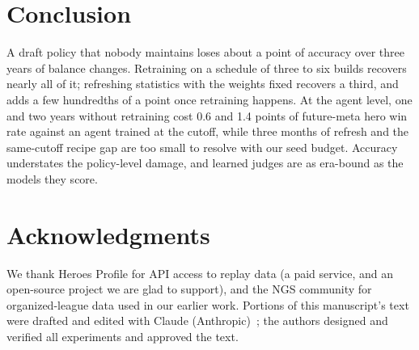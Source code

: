\documentclass[journal]{IEEEtran}
\newif\ifanonymous
\begin{document}
\section{Conclusion}

A draft policy that nobody maintains loses about a point of accuracy
over three years of balance changes. Retraining on a schedule of three
to six builds recovers nearly all of it; refreshing statistics with the
weights fixed recovers a third, and adds a few hundredths of a point
once retraining happens. At the agent level, one and two years
without retraining cost 0.6 and 1.4 points of future-meta hero win
rate against an agent trained at the cutoff, while three months of
refresh and the same-cutoff recipe gap are too small to resolve with
our seed budget. Accuracy
understates the policy-level damage, and learned judges are as
era-bound as the models they score.

\ifanonymous
\section*{AI Disclosure}
Portions of this manuscript's text were drafted and edited with Claude
(Anthropic)~\cite{claude}; the authors designed and verified all
experiments and approved the text.
\else
\section*{Acknowledgments}
We thank Heroes Profile for API access to replay data (a paid service,
and an open-source project we are glad to support), and the NGS
community for organized-league data used in our earlier work. Portions
of this manuscript's text were drafted and edited with Claude
(Anthropic)~\cite{claude}; the authors designed and verified all
experiments and approved the text.
\fi
\end{document}
